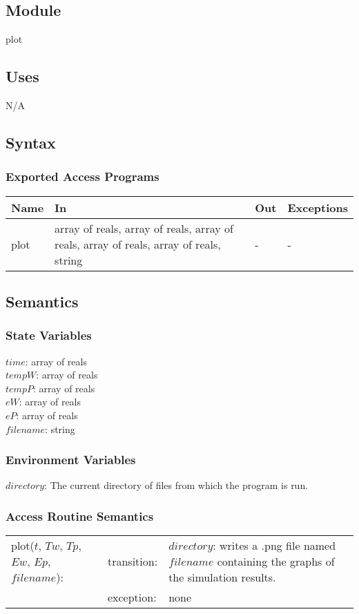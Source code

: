 \documentclass[12pt]{article}
\begin{document}
\subsection{Module}
plot
\subsection{Uses}
N/A
\subsection{Syntax}
\subsubsection{Exported Access Programs}
\begin{center}
\begin{tabular}{p{2cm} p{8cm} p{2cm} p{2cm}}
\hline
\textbf{Name} & \textbf{In} & \textbf{Out} & \textbf{Exceptions} \\
\hline
plot & array of reals, array of reals, array of reals, array of reals, array of reals, string & - & - \\
\hline
\end{tabular}
\end{center}
\subsection{Semantics}
\subsubsection{State Variables}
$time$: array of reals \\
$tempW$: array of reals \\
$tempP$: array of reals \\
$eW$: array of reals \\
$eP$: array of reals \\
$filename$: string
\subsubsection{Environment Variables}
$directory$: The current directory of files from which the program is run.
\subsubsection{Access Routine Semantics}
\begin{center}
\begin{tabular}{l l p{6cm}}
plot($t$, $Tw$, $Tp$, $Ew$, $Ep$, $filename$): & transition: & $directory$: writes a .png file named $filename$ containing the graphs of the simulation results. \\
& exception: & none \\
\end{tabular}
\end{center}
\end{document}
